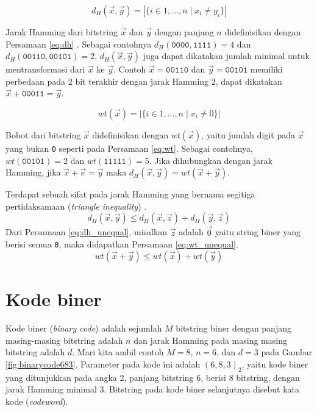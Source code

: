 \begin{equation} \label{eq:dh}
d_H(\vec{x},\vec{y}) = |\{i \in {1,\ldots,n} \mid x_i \neq y_i\}|
\end{equation}

Jarak Hamming dari bitstring $\vec{x}$ dan $\vec{y}$ dengan panjang $n$ didefinisikan dengan Persamaan \ref{eq:dh} \cite{Cicalese2000}. Sebagai contohnya $d_H(\texttt{0000},\texttt{1111})= 4$ dan $d_H(\texttt{00110},\texttt{00101})= 2$. $d_H(\vec{x},\vec{y})$ juga dapat dikatakan jumlah minimal untuk mentransformasi dari $\vec{x}$ ke $\vec{y}$. Contoh $\vec{x}=\texttt{00110}$ dan $\vec{y}=\texttt{00101}$ memiliki perbedaan pada 2 bit terakhir dengan jarak Hamming 2, dapat dikatakan $\vec{x}+\texttt{00011} = \vec{y}$.

\begin{equation} \label{eq:wt}
wt(\vec{x}) = |\{i \in {1,\ldots,n} \mid x_i \neq 0\}|
\end{equation}

Bobot dari bitstring $\vec{x}$ didefinisikan dengan $wt(\vec{x})$, yaitu jumlah digit pada $\vec{x}$ yang bukan \texttt{0} seperti pada Persamaan \ref{eq:wt}. Sebagai contohnya, $wt(\texttt{00101}) = 2$ dan $wt(\texttt{11111}) = 5$. Jika dihubungkan dengan jarak Hamming, jika $\vec{x}+\vec{e} = \vec{y}$ maka $d_H(\vec{x},\vec{y}) = wt(\vec{x}+\vec{y})$.

Terdapat sebuah sifat pada jarak Hamming yang bernama segitiga pertidaksamaan (\textit{triangle inequality}) \cite{VanLint2016}.
\begin{equation} \label{eq:dh_unequal}
d_H(\vec{x},\vec{y}) \le d_H(\vec{x},\vec{z}) + d_H(\vec{y},\vec{z})
\end{equation}
Dari Persamaan \ref{eq:dh_unequal}, misalkan $\vec{z}$ adalah $\vec{0}$ yaitu string biner yang berisi semua \texttt{0}, maka didapatkan Persamaan \ref{eq:wt_unequal}.
\begin{equation} \label{eq:wt_unequal}
wt(\vec{x}+\vec{y}) \le wt(\vec{x}) + wt(\vec{y})
\end{equation}


\section{Kode biner}

Kode biner (\textit{binary code}) adalah sejumlah $M$ bitstring biner dengan panjang masing-masing bitstring adalah $n$ dan jarak Hamming pada masing masing bitstring adalah $d$. Mari kita ambil contoh $M=8$, $n=6$, dan $d=3$ pada Gambar \ref{fig:binarycode683}. Parameter pada kode ini adalah $(6,8,3)_2$, yaitu kode biner yang ditunjukkan pada angka 2, panjang bitstring 6, berisi 8 bitstring, dengan jarak Hamming minimal 3. Bitstring pada kode biner selanjutnya disebut kata kode (\textit{codeword}).

